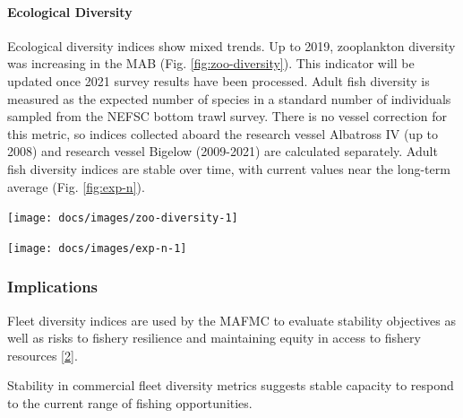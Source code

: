 \documentclass[
  10pt,
]{article}
\let\origfigure\figure
\let\endorigfigure\endfigure
\renewenvironment{figure}[1][2] {
    \expandafter\origfigure\expandafter[H]
} {
    \endorigfigure
}
\begin{document}
\hypertarget{ecological-diversity}{%
\paragraph{Ecological Diversity}\label{ecological-diversity}}

Ecological diversity indices show mixed trends. Up to 2019, zooplankton
diversity was increasing in the MAB (Fig. \ref{fig:zoo-diversity}). This
indicator will be updated once 2021 survey results have been processed.
Adult fish diversity is measured as the expected number of species in a
standard number of individuals sampled from the NEFSC bottom trawl
survey. There is no vessel correction for this metric, so indices
collected aboard the research vessel Albatross IV (up to 2008) and
research vessel Bigelow (2009-2021) are calculated separately. Adult
fish diversity indices are stable over time, with current values near
the long-term average (Fig. \ref{fig:exp-n}).

\begin{figure}

{\centering \texttt{[image: docs/images/zoo-diversity-1]} 

}

\caption{Zooplankton diversity in the Mid-Atlantic Bight up to 2019, based on Shannon diversity index.}\label{fig:zoo-diversity}
\end{figure}

\begin{figure}

{\centering \texttt{[image: docs/images/exp-n-1]} 

}

\caption{Adult fish diversity the Mid-Atlantic Bight, based on expected number of species.}\label{fig:exp-n}
\end{figure}

\hypertarget{implications-3}{%
\subsubsection{Implications}\label{implications-3}}

Fleet diversity indices are used by the MAFMC to evaluate stability
objectives as well as risks to fishery resilience and maintaining equity
in access to fishery resources
{[}\protect\hyperlink{ref-gaichas_implementing_2018}{2}{]}.

Stability in commercial fleet diversity metrics suggests stable capacity
to respond to the current range of fishing opportunities.
\end{document}
